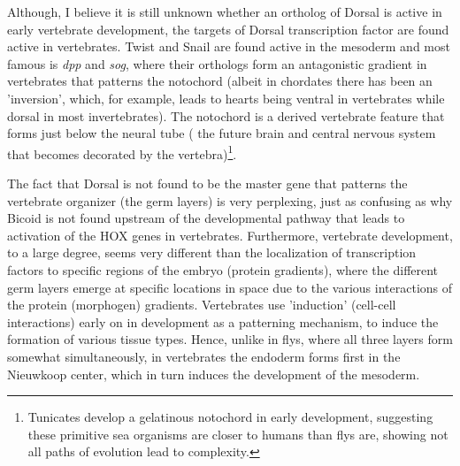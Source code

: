 Although, I believe it is still unknown whether an ortholog of Dorsal is active in early vertebrate development, the targets of Dorsal transcription factor are found active in vertebrates\cite{pmid14756329}.  Twist and Snail are found active in the mesoderm and most famous is \textit{dpp} and \textit{sog}, where their orthologs form an antagonistic gradient in vertebrates that patterns the notochord (albeit in chordates there has been an 'inversion', which, for example, leads to hearts being ventral in vertebrates while dorsal in most invertebrates).  The notochord is a derived vertebrate feature that forms just below the neural tube ( the future brain and central nervous system that becomes decorated by the vertebra)\footnote{Tunicates develop a gelatinous notochord in early development, suggesting these primitive sea organisms are closer to humans than flys are, showing not all paths of evolution lead to complexity.}. 

The fact that Dorsal is not found to be the master gene that patterns the vertebrate organizer (the germ layers) is very perplexing, just as confusing as why Bicoid is not found upstream of the developmental pathway that leads to activation of the HOX genes in vertebrates.  Furthermore, vertebrate development, to a large degree, seems very different than the localization of transcription factors to specific regions of the embryo (protein gradients), where the different germ layers emerge at specific locations in space due to the various interactions of the protein (morphogen) gradients. Vertebrates use 'induction' (cell-cell interactions) early on in development as a patterning mechanism, to induce the formation of various tissue types.  Hence, unlike in flys, where all three layers form somewhat simultaneously, in vertebrates the endoderm forms first in the Nieuwkoop center, which in turn induces the development of the mesoderm. 
  
